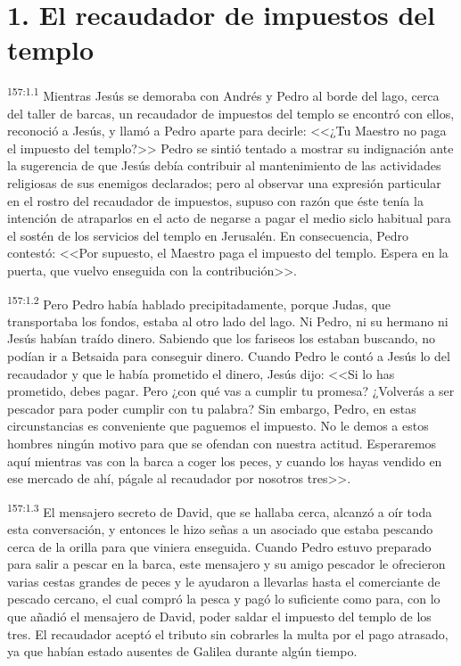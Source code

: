 \section*{1. El recaudador de impuestos del templo}
\par 
\textsuperscript{157:1.1} Mientras Jesús se demoraba con Andrés y Pedro al borde del lago, cerca del taller de barcas, un recaudador de impuestos del templo se encontró con ellos, reconoció a Jesús, y llamó a Pedro aparte para decirle: <<¿Tu Maestro no paga el impuesto del templo?>> Pedro se sintió tentado a mostrar su indignación ante la sugerencia de que Jesús debía contribuir al mantenimiento de las actividades religiosas de sus enemigos declarados; pero al observar una expresión particular en el rostro del recaudador de impuestos, supuso con razón que éste tenía la intención de atraparlos en el acto de negarse a pagar el medio siclo habitual para el sostén de los servicios del templo en Jerusalén. En consecuencia, Pedro contestó: <<Por supuesto, el Maestro paga el impuesto del templo. Espera en la puerta, que vuelvo enseguida con la contribución>>.

\par 
\textsuperscript{157:1.2} Pero Pedro había hablado precipitadamente, porque Judas, que transportaba los fondos, estaba al otro lado del lago. Ni Pedro, ni su hermano ni Jesús habían traído dinero. Sabiendo que los fariseos los estaban buscando, no podían ir a Betsaida para conseguir dinero. Cuando Pedro le contó a Jesús lo del recaudador y que le había prometido el dinero, Jesús dijo: <<Si lo has prometido, debes pagar. Pero ¿con qué vas a cumplir tu promesa? ¿Volverás a ser pescador para poder cumplir con tu palabra? Sin embargo, Pedro, en estas circunstancias es conveniente que paguemos el impuesto. No le demos a estos hombres ningún motivo para que se ofendan con nuestra actitud. Esperaremos aquí mientras vas con la barca a coger los peces, y cuando los hayas vendido en ese mercado de ahí, págale al recaudador por nosotros tres>>.

\par 
\textsuperscript{157:1.3} El mensajero secreto de David, que se hallaba cerca, alcanzó a oír toda esta conversación, y entonces le hizo señas a un asociado que estaba pescando cerca de la orilla para que viniera enseguida. Cuando Pedro estuvo preparado para salir a pescar en la barca, este mensajero y su amigo pescador le ofrecieron varias cestas grandes de peces y le ayudaron a llevarlas hasta el comerciante de pescado cercano, el cual compró la pesca y pagó lo suficiente como para, con lo que añadió el mensajero de David, poder saldar el impuesto del templo de los tres. El recaudador aceptó el tributo sin cobrarles la multa por el pago atrasado, ya que habían estado ausentes de Galilea durante algún tiempo.

